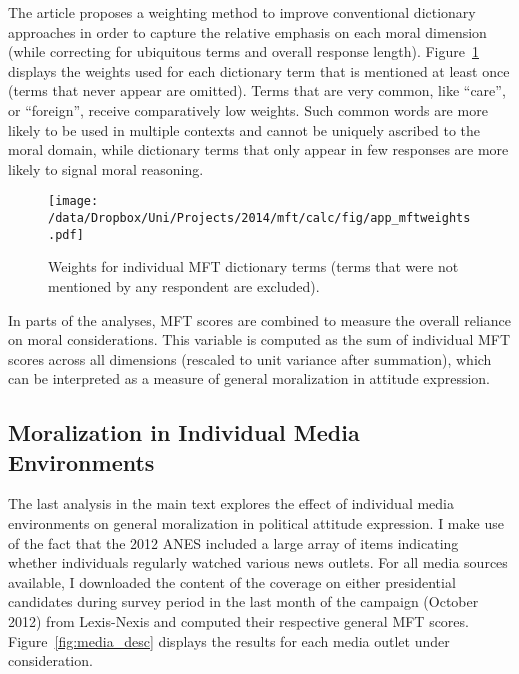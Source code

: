 The article proposes a weighting method to improve conventional dictionary approaches in order to capture the relative emphasis on each moral dimension (while correcting for ubiquitous terms and overall response length). Figure~\ref{fig:mft_weights} displays the weights used for each dictionary term that is mentioned at least once (terms that never appear are omitted). Terms that are very common, like ``care'', or ``foreign'', receive comparatively low weights. Such common words are more likely to be used in multiple contexts and cannot be uniquely ascribed to the moral domain, while dictionary terms that only appear in few responses are more likely to signal moral reasoning.

\begin{figure}[ht]\centering
\texttt{[image: /data/Dropbox/Uni/Projects/2014/mft/calc/fig/app\_mftweights.pdf]}
\caption[Weights for individual MFT dictionary terms]{Weights for individual MFT dictionary terms (terms that were not mentioned by any respondent are excluded).}\label{fig:mft_weights}
\end{figure}

In parts of the analyses, MFT scores are combined to measure the overall reliance on moral considerations. This variable is computed as the sum of individual MFT scores across all dimensions (rescaled to unit variance after summation), which can be interpreted as a measure of general moralization in attitude expression.


\clearpage
\subsection{Moralization in Individual Media Environments}

The last analysis in the main text explores the effect of individual media environments on general moralization in political attitude expression. I make use of the fact that the 2012 ANES included a large array of items indicating whether individuals regularly watched various news outlets. For all media sources available, I downloaded the content of the coverage on either presidential candidates during survey period in the last month of the campaign (October 2012) from Lexis-Nexis and computed their respective general MFT scores. Figure~\ref{fig:media_desc} displays the results for each media outlet under consideration.

